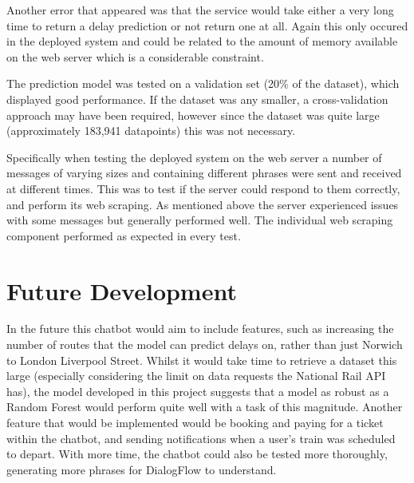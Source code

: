 \documentclass[12pt,a4paper]{article}
\begin{document}
    Another error that appeared was that the service would take either a very long time to return a delay prediction or not return one at all. Again this only occured in the deployed system and could be related to the amount of memory available on the web server which is a considerable constraint.
    
    The prediction model was tested on a validation set (20\% of the dataset), which displayed good performance. If the dataset was any smaller, a cross-validation approach may have been required, however since the dataset was quite large (approximately 183,941 datapoints) this was not necessary.
    
    Specifically when testing the deployed system on the web server a number of messages of varying sizes and containing different phrases were sent and received at different times. This was to test if the server could respond to them correctly, and perform its web scraping. As mentioned above the server experienced issues with some messages but generally performed well. The individual web scraping component performed as expected in every test.

    \section{Future Development}
    In the future this chatbot would aim to include features, such as increasing the number of routes that the model can predict delays on, rather than just Norwich to London Liverpool Street. Whilst it would take time to retrieve a dataset this large (especially considering the limit on data requests the National Rail API has), the model developed in this project suggests that a model as robust as a Random Forest would perform quite well with a task of this magnitude. Another feature that would be implemented would be booking and paying for a ticket within the chatbot, and sending notifications when a user's train was scheduled to depart. With more time, the chatbot could also be tested more thoroughly, generating more phrases for DialogFlow to understand.
    
    
    
    
\end{document}
